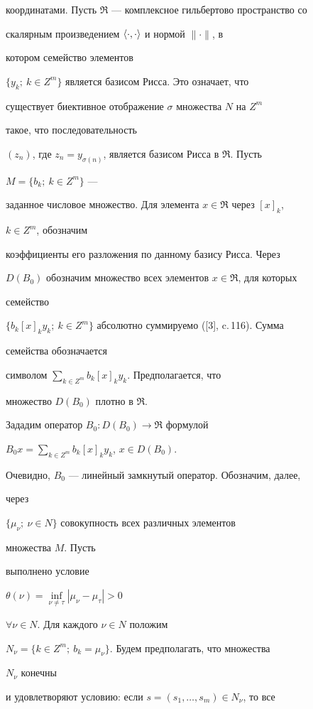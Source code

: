 координатами. Пусть $\Re$ --- комплексное гильбертово пространство со 


скалярным произведением $\langle\cdot,\cdot\rangle$ и нормой $\|\cdot\|$, в 


котором семейство элементов 


$\{y_k;\ k\in Z^m\}$ является базисом Рисса. Это означает, что 


существует биективное отображение $\sigma$ множества $N$ на $Z^m$ 


такое, что последовательность 


$(z_n)$, где $z_n=y_{\sigma(n)}$, является базисом Рисса в $\Re$. Пусть 


$M=\{b_k;\ k\in Z^m\}$ --- 


заданное числовое множество. Для элемента $x\in\Re$ через $[x]_k$, 


$k\in Z^m$, обозначим 


коэффициенты его разложения по данному базису Рисса. Через 


$D(B_0)$ обозначим множество всех элементов $x\in\Re$, для которых 


семейство 


$\{b_k[x]_k y_k;\ k\in Z^m\}$ абсолютно суммируемо ([3], c.\,116). Сумма 


семейства обозначается 


символом $\sum\limits_{k\in Z^m}b_k[x]_k y_k$. Предполагается, что 


множество $D(B_0)$ плотно в $\Re$. 


Зададим оператор $B_0:D(B_0)\to\Re$ формулой 


$B_0x=\sum\limits_{k\in Z^m}b_k[x]_k y_k$, $x\in D(B_0)$. 


Очевидно, $B_0$ --- линейный замкнутый оператор. Обозначим, далее, 


через 


$\{\mu_\nu;\ \nu\in N\}$ совокупность всех различных элементов 


множества $M$. Пусть 


выполнено условие 


$\theta(\nu)=\inf\limits_{\nu\ne\tau}|\mu_\nu-\mu_\tau|>0$ 


$\forall\nu\in N$. Для каждого $\nu\in N$ положим 


$N_\nu=\{k\in Z^m;\ b_k=\mu_\nu\}$. Будем предполагать, что множества 


$N_\nu$ конечны 


и удовлетворяют условию: если $s=(s_1,\dotsc,s_m)\in N_\nu$, то все 


